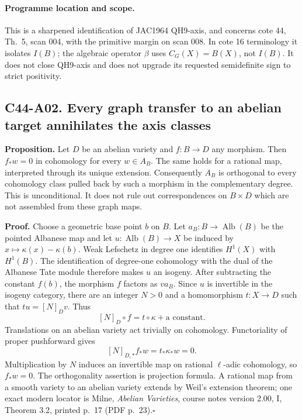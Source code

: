 \documentclass[11pt]{article}
\theoremstyle{remark}\newtheorem{remark}[theorem]{Remark}
\begin{document}
\paragraph{Programme location and scope.}
This is a sharpened identification of JAC1964 QH9-axis, and concerns
cote 44, Th.~5, scan 004, with the primitive margin on scan 008.
In cote 16 terminology it isolates $I(B)$; the algebraic operator
$\beta$ uses $C_G(X)=B(X)$, not $I(B)$. It does not close
QH9-axis and does not upgrade its requested semidefinite sign to
strict positivity.

\subsection*{C44-A02. Every graph transfer to an abelian target annihilates the axis classes}

\textbf{Proposition.}
Let $D$ be an abelian variety and $f:B\longrightarrow D$ any
morphism. Then $f_*w=0$ in cohomology for every $w\in A_B$.
The same holds for a rational map, interpreted through its unique
extension. Consequently $A_B$ is orthogonal to every cohomology
class pulled back by such a morphism in the complementary degree.
This is unconditional. It does not rule out correspondences on
$B\times D$ which are not assembled from these graph maps.

\textbf{Proof.}
Choose a geometric base point $b$ on $B$. Let
$a_B:B\longrightarrow\operatorname{Alb}(B)$ be the pointed Albanese
map and let $u:\operatorname{Alb}(B)\longrightarrow X$ be induced by
$x\mapsto\kappa(x)-\kappa(b)$.
Weak Lefschetz in degree one identifies $H^1(X)$ with $H^1(B)$.
The identification of degree-one cohomology with the dual of the
Albanese Tate module therefore makes $u$ an isogeny.
After subtracting the constant $f(b)$, the morphism $f$ factors as
$v a_B$. Since $u$ is invertible in the isogeny category, there are
an integer $N>0$ and a homomorphism $t:X\longrightarrow D$ such that
$t u=[N]_D v$. Thus
\[
 [N]_D\circ f=t\circ\kappa+\text{a constant}.
\]
Translations on an abelian variety act trivially on cohomology.
Functoriality of proper pushforward gives
\[
 [N]_{D,*}f_*w=t_*\kappa_*w=0.
\]
Multiplication by $N$ induces an invertible map on rational
$\ell$-adic cohomology, so $f_*w=0$. The orthogonality assertion is
projection formula. A rational map from a smooth variety to an
abelian variety extends by Weil's extension theorem; one exact
modern locator is Milne, \emph{Abelian Varieties}, course notes
version 2.00, I, Theorem 3.2, printed p.~17 (PDF p.~23).\hfill$\square$
\end{document}
